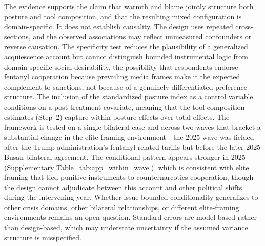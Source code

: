 \documentclass[12pt,letterpaper]{article}
\begin{document}
The evidence supports the claim that warmth and blame jointly structure both posture and tool composition, and that the resulting mixed configuration is domain-specific. It does not establish causality. The design uses repeated cross-sections, and the observed associations may reflect unmeasured confounders or reverse causation. The specificity test reduces the plausibility of a generalized acquiescence account but cannot distinguish bounded instrumental logic from domain-specific social desirability, the possibility that respondents endorse fentanyl cooperation because prevailing media frames make it the expected complement to sanctions, not because of a genuinely differentiated preference structure. The inclusion of the standardized posture index as a control variable conditions on a post-treatment covariate, meaning that the tool-composition estimates (Step~2) capture within-posture effects over total effects. The framework is tested on a single bilateral case and across two waves that bracket a substantial change in the elite framing environment---the 2025 wave was fielded after the Trump administration's fentanyl-related tariffs but before the later-2025 Busan bilateral agreement. The conditional pattern appears stronger in 2025 (Supplementary Table~\ref{tab:app_within_wave}), which is consistent with elite framing that tied punitive instruments to counternarcotics cooperation, though the design cannot adjudicate between this account and other political shifts during the intervening year. Whether issue-bounded conditionality generalizes to other crisis domains, other bilateral relationships, or different elite-framing environments remains an open question. Standard errors are model-based rather than design-based, which may understate uncertainty if the assumed variance structure is misspecified. %
\end{document}
